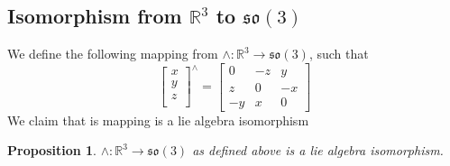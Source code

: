 \documentclass[a4paper]{article}
\newtheorem{prop}{Proposition}
\begin{document}
\subsection*{Isomorphism from $\mathds{R}^3$ to $\mathfrak{so}(3)$}
We define the following mapping from $\wedge : \mathds{R}^3 \rightarrow \mathfrak{so}(3)$, such that
\[
  \begin{bmatrix}
    x \\
    y \\
    z \\
  \end{bmatrix}^{\wedge} =
  \begin{bmatrix}
    0 & -z & y \\
    z & 0 & -x \\
    -y & x & 0
  \end{bmatrix}
\]
We claim that is mapping is a lie algebra isomorphism
\begin{prop}
  $\wedge: \mathds{R}^3 \rightarrow \mathfrak{so}(3)$ as defined above is a lie algebra isomorphism.
\end{prop}
\end{document}
